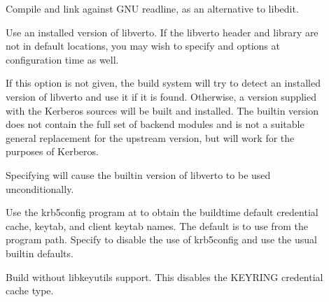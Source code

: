 \documentclass[letterpaper,10pt,english]{sphinxmanual}
\begin{document}
\begin{description}
\item[{\sphinxstylestrong{\sphinxhyphen{}}}] \leavevmode
\sphinxAtStartPar
Compile and link against GNU readline, as an alternative to libedit.

\item[{\sphinxstylestrong{\sphinxhyphen{}}}] \leavevmode
\sphinxAtStartPar
Use an installed version of libverto.  If the libverto header and
library are not in default locations, you may wish to specify
 and  options
at configuration time as well.

\sphinxAtStartPar
If this option is not given, the build system will try to detect
an installed version of libverto and use it if it is found.
Otherwise, a version supplied with the Kerberos sources will be
built and installed.  The built\sphinxhyphen{}in version does not contain the
full set of back\sphinxhyphen{}end modules and is not a suitable general
replacement for the upstream version, but will work for the
purposes of Kerberos.

\sphinxAtStartPar
Specifying \sphinxstylestrong{\sphinxhyphen{}} will cause the built\sphinxhyphen{}in
version of libverto to be used unconditionally.

\item[{\sphinxstylestrong{\sphinxhyphen{}}}] \leavevmode
\sphinxAtStartPar
Use the krb5\sphinxhyphen{}config program at  to obtain the build\sphinxhyphen{}time
default credential cache, keytab, and client keytab names.  The
default is to use  from the program path.  Specify
 to disable the use of krb5\sphinxhyphen{}config and
use the usual built\sphinxhyphen{}in defaults.

\item[{\sphinxstylestrong{\sphinxhyphen{}}}] \leavevmode
\sphinxAtStartPar
Build without libkeyutils support.  This disables the KEYRING
credential cache type.

\end{description}
\end{document}
